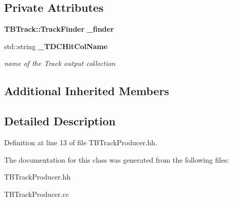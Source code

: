\subsection*{Private Attributes}
\begin{DoxyCompactItemize}
\item 
{\bf T\-B\-Track\-::\-Track\-Finder} {\bfseries \-\_\-finder}\label{classTBTrackProducer_af6ef70618261f9e609a35018aba95110}

\item 
std\-::string {\bf \-\_\-\-T\-D\-C\-Hit\-Col\-Name}\label{classTBTrackProducer_aaa9b990c825fb14a9b0a16254dc65cea}

\begin{DoxyCompactList}\small\item\em name of the Track output collection \end{DoxyCompactList}\end{DoxyCompactItemize}
\subsection*{Additional Inherited Members}


\subsection{Detailed Description}


Definition at line 13 of file T\-B\-Track\-Producer.\-hh.



The documentation for this class was generated from the following files\-:\begin{DoxyCompactItemize}
\item 
T\-B\-Track\-Producer.\-hh\item 
T\-B\-Track\-Producer.\-cc\end{DoxyCompactItemize}
